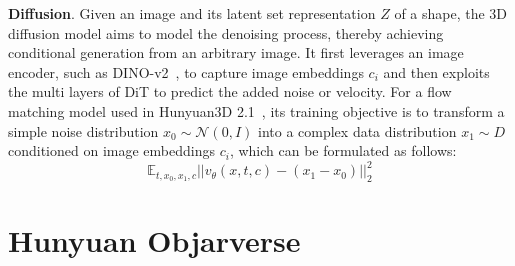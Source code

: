 \documentclass{article} %
\begin{document}
{\bf Diffusion}. Given an image and its latent set representation $Z$ of a shape, the 3D diffusion model aims to model the denoising process, thereby achieving conditional generation from an arbitrary image. It first leverages an image encoder, such as DINO-v2~\cite{}, to capture image embeddings $c_i$ and then exploits the multi layers of DiT to predict the added noise or velocity. For a flow matching model used in Hunyuan3D 2.1~\cite{}, its training objective is to transform a simple noise distribution $x_0 \sim \mathcal{N}(0, I)$ into a complex data distribution $x_1 \sim D$ conditioned on image embeddings $c_i$, which can be formulated as follows:
\begin{equation}
\mathbb{E}_{t, {x}_0, {x_1}, c}\vert\vert{v}_\theta({x}, t, c)-(x_1-x_0)\vert\vert_2^2
\end{equation}






\section{Hunyuan Objarverse}


\end{document}
